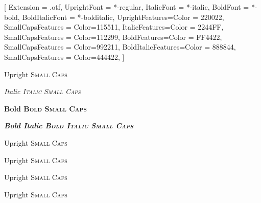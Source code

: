 \documentclass{article}
\begin{document}
[
  Extension = {.otf},
  UprightFont = {*-regular}, ItalicFont = {*-italic},
  BoldFont = {*-bold}, BoldItalicFont = {*-bolditalic},
  UprightFeatures={Color = 220022,
  SmallCapsFeatures = {Color=115511}},
  ItalicFeatures={Color = 2244FF,
  SmallCapsFeatures = {Color=112299}},
  BoldFeatures={Color = FF4422,
  SmallCapsFeatures = {Color=992211}},
  BoldItalicFeatures={Color = 888844,
  SmallCapsFeatures = {Color=444422}},
]

Upright {\scshape Small Caps}\par
{\itshape Italic {\scshape Italic Small Caps}}\par
{\bfseries Bold {\scshape Bold Small Caps}}\par
{\itshape \bfseries Bold Italic {\scshape Bold Italic Small Caps}}\par

Upright {\scshape Small Caps}\par

Upright {\scshape Small Caps}\par

Upright {\scshape Small Caps}\par

Upright {\scshape Small Caps}\par
\end{document}

